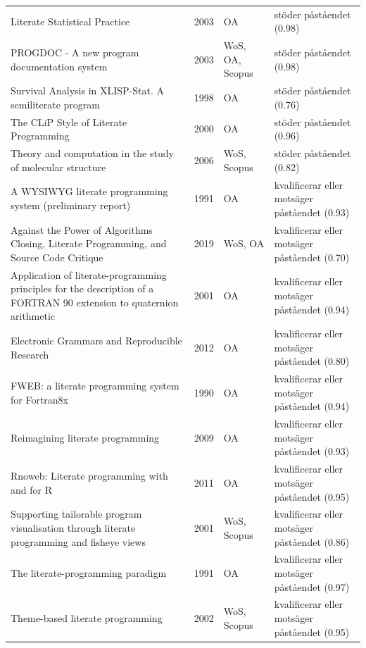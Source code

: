 \begin{longtable}{@{}%
  >{\raggedright\arraybackslash}p{}c%
  >{\raggedright\arraybackslash}p{}%
  >{\raggedright\arraybackslash}p{}@{}}
Literate Statistical Practice & 2003 & OA & stöder påståendet (0.98) \\
PROGDOC - A new program documentation system & 2003 & WoS, OA, Scopus & stöder påståendet (0.98) \\
Survival Analysis in XLISP-Stat. A semiliterate program & 1998 & OA & stöder påståendet (0.76) \\
The CLiP Style of Literate Programming & 2000 & OA & stöder påståendet (0.96) \\
Theory and computation in the study of molecular structure & 2006 & WoS, Scopus & stöder påståendet (0.82) \\
A WYSIWYG literate programming system (preliminary report) & 1991 & OA & kvalificerar eller motsäger påståendet (0.93) \\
Against the Power of Algorithms Closing, Literate Programming, and Source Code Critique & 2019 & WoS, OA & kvalificerar eller motsäger påståendet (0.70) \\
Application of literate-programming principles for the description of a FORTRAN 90 extension to quaternion arithmetic & 2001 & OA & kvalificerar eller motsäger påståendet (0.94) \\
Electronic Grammars and Reproducible Research & 2012 & OA & kvalificerar eller motsäger påståendet (0.80) \\
FWEB: a literate programming system for Fortran8x & 1990 & OA & kvalificerar eller motsäger påståendet (0.94) \\
Reimagining literate programming & 2009 & OA & kvalificerar eller motsäger påståendet (0.93) \\
Rnoweb: Literate programming with and for R & 2011 & OA & kvalificerar eller motsäger påståendet (0.95) \\
Supporting tailorable program visualisation through literate programming and fisheye views & 2001 & WoS, Scopus & kvalificerar eller motsäger påståendet (0.86) \\
The literate-programming paradigm & 1991 & OA & kvalificerar eller motsäger påståendet (0.97) \\
Theme-based literate programming & 2002 & WoS, Scopus & kvalificerar eller motsäger påståendet (0.95) \\
\end{longtable}
\endgroup
